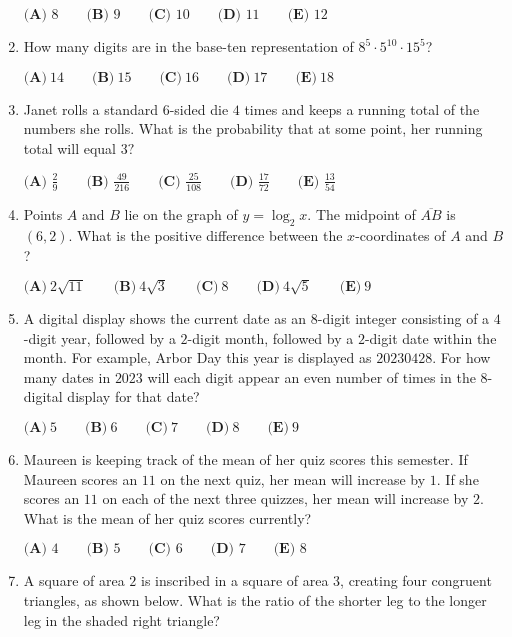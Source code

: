 \documentclass{article}
\begin{document}
\begin{enumerate}[label=\arabic*., itemsep=0.5em]
$\textbf{(A) }8\qquad\textbf{(B) }9\qquad\textbf{(C) }10\qquad\textbf{(D) }11\qquad\textbf{(E) }12$\par \vspace{0.5em}\item How many digits are in the base-ten representation of $8^5 \cdot 5^{10} \cdot 15^5$?

$\textbf{(A)}~14\qquad\textbf{(B)}~15\qquad\textbf{(C)}~16\qquad\textbf{(D)}~17\qquad\textbf{(E)}~18\qquad$\par \vspace{0.5em}\item Janet rolls a standard $6$-sided die $4$ times and keeps a running total of the numbers she rolls. What is the probability that at some point, her running total will equal $3?$

$\textbf{(A) }\frac{2}{9}\qquad\textbf{(B) }\frac{49}{216}\qquad\textbf{(C) }\frac{25}{108}\qquad\textbf{(D) }\frac{17}{72}\qquad\textbf{(E) }\frac{13}{54}$\par \vspace{0.5em}\item Points $A$ and $B$ lie on the graph of $y=\log_{2}x$. The midpoint of $\overline{AB}$ is $(6, 2)$. What is the positive difference between the $x$-coordinates of $A$ and $B$?

$\textbf{(A)}~2\sqrt{11}\qquad\textbf{(B)}~4\sqrt{3}\qquad\textbf{(C)}~8\qquad\textbf{(D)}~4\sqrt{5}\qquad\textbf{(E)}~9$\par \vspace{0.5em}\item A digital display shows the current date as an $8$-digit integer consisting of a $4$-digit year, followed by a $2$-digit month, followed by a $2$-digit date within the month. For example, Arbor Day this year is displayed as $20230428$. For how many dates in $2023$ will each digit appear an even number of times in the 8-digital display for that date?

$\textbf{(A)}~5\qquad\textbf{(B)}~6\qquad\textbf{(C)}~7\qquad\textbf{(D)}~8\qquad\textbf{(E)}~9$\par \vspace{0.5em}\item Maureen is keeping track of the mean of her quiz scores this semester. If Maureen scores an $11$ on the next quiz, her mean will increase by $1$. If she scores an $11$ on each of the next three quizzes, her mean will increase by $2$. What is the mean of her quiz scores currently?

$\textbf{(A) }4\qquad\textbf{(B) }5\qquad\textbf{(C) }6\qquad\textbf{(D) }7\qquad\textbf{(E) }8$\par \vspace{0.5em}\item A square of area $2$ is inscribed in a square of area $3$, creating four congruent triangles, as shown below. What is the ratio of the shorter leg to the longer leg in the shaded right triangle?


\end{enumerate}
\end{document}
